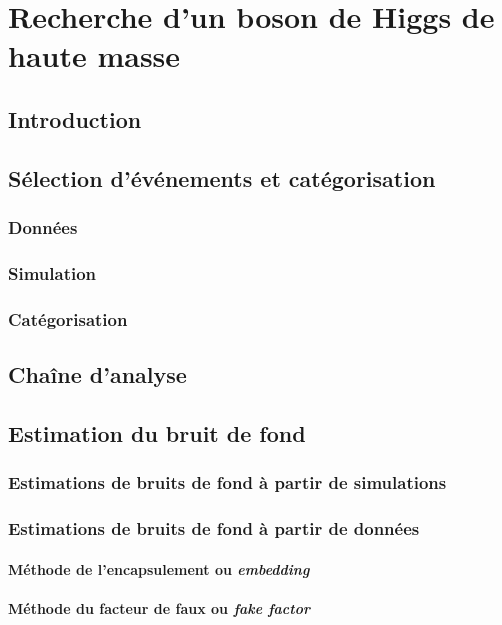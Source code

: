 \chapter{Recherche d'un boson de Higgs de haute masse}

\section{Introduction}

\section{Sélection d'événements et catégorisation}
\subsection{Données}
\subsection{Simulation}
\subsection{Catégorisation}

\section{Chaîne d'analyse}

\section{Estimation du bruit de fond}
\subsection{Estimations de bruits de fond à partir de simulations}
\subsection{Estimations de bruits de fond à partir de données}
\subsubsection{Méthode de l'encapsulement ou \emph{embedding}}
\subsubsection{Méthode du facteur de faux ou \emph{fake factor}}

